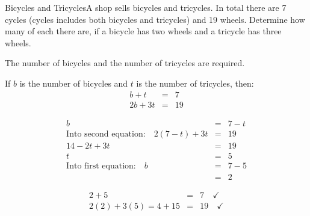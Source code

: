 \documentclass[10pt,a4paper,titlepage,twoside,openright]{report}
\begin{document}
\begin{wex}{Bicycles and Tricycles}{A shop sells bicycles and tricycles. In total there are 7 cycles (cycles includes both bicycles and tricycles) and 19 wheels. Determine how many of each there are, if a bicycle has two wheels and a tricycle has three wheels.}{
The number of bicycles and the number of tricycles are required.

If $b$ is the number of bicycles and $t$ is the number of tricycles, then:
\begin{eqnarray*}
b+t&=&7\\
2b+3t&=&19
\end{eqnarray*}

\begin{eqnarray*}
b&=&7-t\\
\mbox{Into second equation:}\quad 2(7-t)+3t&=&19\\
14-2t+3t&=&19\\
t&=&5\\
\mbox{Into first equation:}\quad b&=&7-5\\
&=&2
\end{eqnarray*}

\begin{eqnarray*}
2+5&=&7\quad \checkmark\\
2(2)+3(5)=4+15&=&19 \quad \checkmark
\end{eqnarray*}}
\end{wex}

\end{document}

